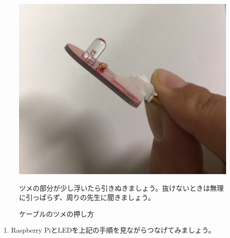 \begin{enumerate}
\begin{figure}[H]
  \hspace{0.04\columnwidth} %
  \begin{minipage}[t]{0.48\columnwidth}
    \centering
    \includegraphics[width=0.8\hsize]{images/chap05/text05-img011.jpg}
    \caption{ケーブルのツメの押し方}
ツメの部分が少し浮いたら引きぬきましょう。抜けないときは無理に引っぱらず、周りの先生に聞きましょう。
  \end{minipage}
\end{figure}
\end{enumerate}
\begin{tcolorbox}[title=\useOmetoi]
\begin{enumerate}
\item Raspberry PiとLEDを上記の手順を見ながらつなげてみましょう。
\end{enumerate}
\end{tcolorbox}















